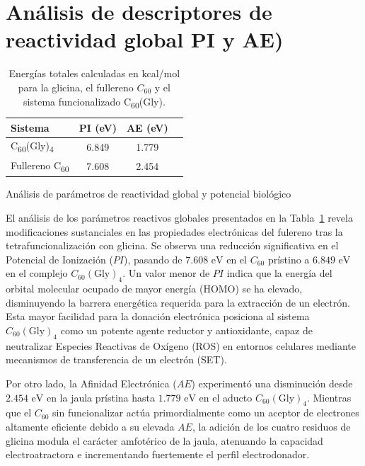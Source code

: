 \section{Análisis de descriptores de reactividad global PI y AE)}
\begin{table}[H]
    \centering
    \caption{Energías totales calculadas en kcal/mol para la glicina, el fullereno $C_{60}$ y el sistema funcionalizado  C\textsubscript{60}(Gly).}
    \label{tab:energias-referencia}
    \renewcommand{\arraystretch}{1.15}
    \begin{tabular}{lccc}
        \toprule
        \textbf{Sistema} & \textbf{PI (eV)} & \textbf{AE (eV)}\\
        \midrule
         C\textsubscript{60}(Gly)\textsubscript{4} & 6.849
 & 1.779 \\
        Fullereno  C\textsubscript{60} & 7.608
 & 2.454 \\
        \bottomrule
    \end{tabular}
\end{table}
{Análisis de parámetros de reactividad global y potencial biológico}

El análisis de los parámetros reactivos globales presentados en la Tabla~\ref{tab:energias-referencia} revela modificaciones sustanciales en las propiedades electrónicas del fulereno tras la tetrafuncionalización con glicina. Se observa una reducción significativa en el Potencial de Ionización ($PI$), pasando de $7.608\text{ eV}$ en el $C_{60}$ prístino a $6.849\text{ eV}$ en el complejo $C_{60}(\text{Gly})_4$. Un valor menor de $PI$ indica que la energía del orbital molecular ocupado de mayor energía (HOMO) se ha elevado, disminuyendo la barrera energética requerida para la extracción de un electrón. Esta mayor facilidad para la donación electrónica posiciona al sistema $C_{60}(\text{Gly})_4$ como un potente agente reductor y antioxidante, capaz de neutralizar Especies Reactivas de Oxígeno (ROS) en entornos celulares mediante mecanismos de transferencia de un electrón (SET).

Por otro lado, la Afinidad Electrónica ($AE$) experimentó una disminución desde $2.454\text{ eV}$ en la jaula prístina hasta $1.779\text{ eV}$ en el aducto $C_{60}(\text{Gly})_4$. Mientras que el $C_{60}$ sin funcionalizar actúa primordialmente como un aceptor de electrones altamente eficiente debido a su elevada $AE$, la adición de los cuatro residuos de glicina modula el carácter amfotérico de la jaula, atenuando la capacidad electroatractora e incrementando fuertemente el perfil electrodonador.

